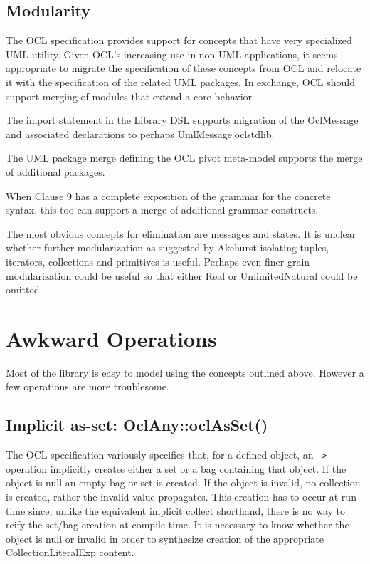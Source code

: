 \documentclass{eceasst}
\begin{document}
\subsection{Modularity}

The OCL specification provides support for concepts that have very specialized UML utility. Given OCL's increasing use in non-UML applications, it seems appropriate to migrate the specification of these concepts from OCL and relocate it with the specification of the related UML packages. In exchange, OCL should support merging of modules that extend a core behavior\cite{Chimiak-Opaka}.

The import statement in the Library DSL supports migration of the OclMessage and associated declarations to perhaps UmlMessage.oclstdlib.

The UML package merge defining the OCL pivot meta-model\cite{OCL-UML} supports the merge of additional packages.

When Clause 9 has a complete exposition of the grammar for the concrete syntax, this too can support a merge of additional grammar constructs. 

The most obvious concepts for elimination are messages and states. It is unclear whether further modularization as suggested by Akehurst\cite{Akehurst} isolating tuples, iterators, collections and primitives is useful. Perhaps even finer grain modularization could be useful so that either Real or UnlimitedNatural could be omitted.

\section{Awkward Operations}\label{AwkwardOperations}

Most of the library is easy to model using the concepts outlined above. However a few operations are more troublesome.

\subsection{Implicit as-set: OclAny::oclAsSet()}

The OCL specification variously specifies that, for a defined object,  an \verb|->| operation implicitly creates either a set or a bag containing that object. If the object is null an empty bag or set is created. If the object is invalid, no collection is created, rather the invalid value propagates. This creation has to occur at run-time since, unlike the equivalent implicit collect shorthand, there is no way to reify the set/bag creation at compile-time. It is necessary to know whether the object is null or invalid in order to synthesize creation of the appropriate CollectionLiteralExp content.
\end{document}
